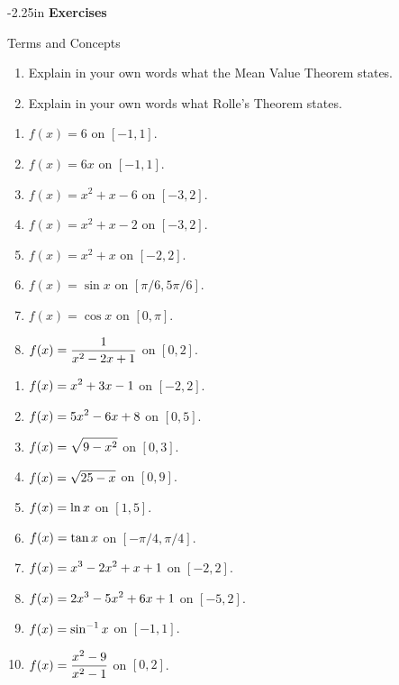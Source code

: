 \begin{adjustwidth*}{}{-2.25in}
\textbf{{\large Exercises}}
\setlength{\columnsep}{25pt}
\begin{multicols*}{2}
\noindent Terms and Concepts \small
\begin{enumerate}[1)]
\item Explain in your own words what the Mean Value Theorem states.
\item Explain in your own words what Rolle's Theorem states.
\end{enumerate} 

 \small


\begin{enumerate}[1),resume]
\item $f(x) = 6$ on $[-1,1]$.
\item $f(x) = 6x$ on $[-1,1]$.
\item $f(x) = x^2+x-6$ on $[-3,2]$.
\item $f(x) = x^2+x-2$ on $[-3,2]$.
\item $f(x) = x^2+x$ on $[-2,2]$.
\item $f(x) = \sin x$ on $[\pi/6,5\pi/6]$.
\item $f(x) = \cos x$ on $[0,\pi]$.
\item $\displaystyle f(x) = \frac{1}{x^2-2x+1}$ on $[0,2]$.
\end{enumerate}


\begin{enumerate}[1),resume]
\item $\displaystyle f(x) = x^2+3x-1$ on $[-2,2]$.
\item $\displaystyle f(x) = 5x^2-6x+8$ on $[0,5]$.
\item $\displaystyle f(x) = \sqrt{9-x^2}$ on $[0,3]$.
\item $\displaystyle f(x) = \sqrt{25-x}$ on $[0,9]$.
\item $\displaystyle f(x) = \ln x$ on $[1,5]$.
\item $\displaystyle f(x) = \tan x$ on $[-\pi/4,\pi/4]$.
\item $\displaystyle f(x) = x^3-2x^2+x+1$ on $[-2,2]$.
\item $\displaystyle f(x) = 2x^3-5x^2+6x+1$ on $[-5,2]$.
\item $\displaystyle f(x) = \sin^{-1} x$ on $[-1,1]$.
\item $\displaystyle f(x) =\frac{x^2-9}{x^2-1}$ on $[0,2]$.
\end{enumerate}


\end{multicols*}
\end{adjustwidth*}
